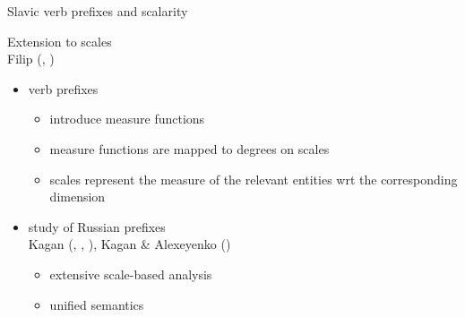 \documentclass[12pt]{beamer}
\begin{document}
\begin{frame}{Slavic verb prefixes and scalarity}

Extension to scales\\\scriptsize Filip (\citeyear{filip2005measure}, \citeyear{filip2008events})\normalsize

\begin{itemize}
\item verb prefixes
\begin{itemize}
\item introduce measure functions
\item measure functions are mapped to degrees on scales 
\item scales represent the measure of the relevant entities wrt the corresponding dimension
\end{itemize}
\item study of Russian prefixes\\\scriptsize Kagan (\citeyear{kagan2011scale}, \citeyear{kagan2012degree}, \citeyear{kagan2013scalarity}), Kagan \& Alexeyenko (\citeyear{kagan_alexeyenko2011adjectival})\small
\begin{itemize}
\item extensive scale-based analysis
\item unified semantics
\end{itemize}

\end{itemize}

\end{frame}
\end{document}
